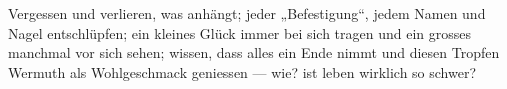 Vergessen und verlieren, was anhängt; jeder „Befestigung“, jedem Namen und Nagel entschlüpfen; ein kleines Glück immer bei sich tragen und ein grosses manchmal vor sich sehen; wissen, dass alles ein Ende nimmt und diesen Tropfen Wermuth als Wohlgeschmack geniessen — wie? ist leben wirklich so schwer?
\par

